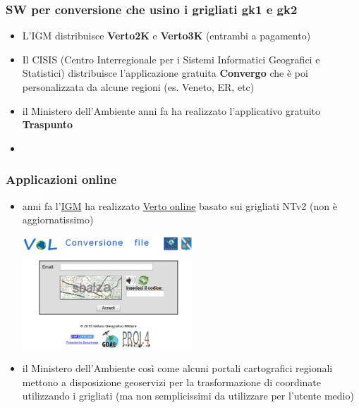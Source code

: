 \documentclass{beamer}
\begin{document}
{\begin{frame}
\frametitle{SW per conversione che usino i grigliati gk1 e gk2}
\begin{itemize}
	\item L'IGM distribuisce \textbf{Verto2K} e \textbf{Verto3K} (entrambi a pagamento)
	\item Il CISIS (Centro Interregionale per i Sistemi Informatici Geografici e Statistici) distribuisce l'applicazione gratuita \textbf{Convergo} che è poi personalizzata da alcune regioni (es. Veneto, ER, etc)
	\item il Ministero dell'Ambiente anni fa ha realizzato l'applicativo gratuito \textbf{Traspunto} 
	\item 
\end{itemize}
\end{frame}

\begin{frame}
\frametitle{Applicazioni online}
\begin{itemize}
\item anni fa l'\href{https://ww.igmi.org}{IGM} ha realizzato \href{http://212.77.67.76/vol/index_file.php}{Verto online} basato sui grigliati NTv2 (non è aggiornatissimo)
\begin{center}
	\includegraphics[width=0.5\textwidth]{pics/verto_online.png}
\end{center}
\item il Ministero dell'Ambiente così come alcuni portali cartografici regionali mettono a disposizione geoservizi per la trasformazione di coordinate utilizzando i grigliati
(ma non semplicissimi da utilizzare per l'utente medio)
\end{itemize}
\end{frame}

}
\end{document}
